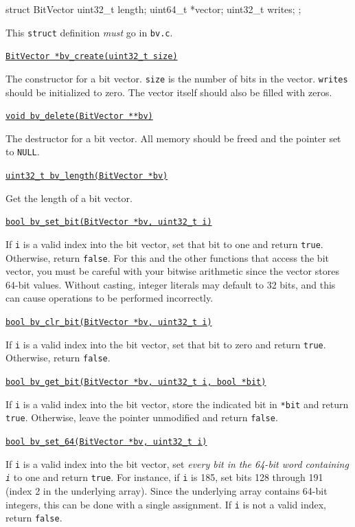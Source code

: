 \documentclass[11pt]{article}
\begin{document}
\begin{clisting}{}
struct BitVector {
    uint32_t length;
    uint64_t *vector;
    uint32_t writes;
};
\end{clisting}

This \texttt{struct} definition \emph{must} go in \texttt{bv.c}.

\setlength{\parindent}{0pt}
\setlength{\parskip}{6pt}

\underline{\texttt{BitVector *bv\_create(uint32\_t size)}}

The constructor for a bit vector. \texttt{size} is the number of bits in the vector. \texttt{writes} should be initialized to zero. The vector itself should also be filled with zeros.
\medskip

\underline{\texttt{void bv\_delete(BitVector **bv)}}

The destructor for a bit vector. All memory should be freed and the pointer set to \texttt{NULL}.
\medskip

\underline{\texttt{uint32\_t bv\_length(BitVector *bv)}}

Get the length of a bit vector.
\medskip

\underline{\texttt{bool bv\_set\_bit(BitVector *bv, uint32\_t i)}}

If \texttt{i} is a valid index into the bit vector, set that bit to one and return \texttt{true}. Otherwise, return \texttt{false}. For this and the other functions that access the bit vector, you must be careful with your bitwise arithmetic since the vector stores 64-bit values. Without casting, integer literals may default to 32 bits, and this can cause operations to be performed incorrectly.
\medskip

\underline{\texttt{bool bv\_clr\_bit(BitVector *bv, uint32\_t i)}}

If \texttt{i} is a valid index into the bit vector, set that bit to zero and return \texttt{true}. Otherwise, return \texttt{false}.
\medskip

\underline{\texttt{bool bv\_get\_bit(BitVector *bv, uint32\_t i, bool *bit)}}

If \texttt{i} is a valid index into the bit vector, store the indicated bit in \texttt{*bit} and return \texttt{true}. Otherwise, leave the pointer unmodified and return \texttt{false}.
\medskip

\underline{\texttt{bool bv\_set\_64(BitVector *bv, uint32\_t i)}}

If  \texttt{i} is a valid index into the bit vector, set \emph{every bit in the 64-bit word containing \texttt{i}} to one and return \texttt{true}. For instance, if \texttt{i} is 185, set bits 128 through 191 (index 2 in the underlying array). Since the underlying array contains 64-bit integers, this can be done with a single assignment. If \texttt{i} is not a valid index, return \texttt{false}.
\medskip
\end{document}
